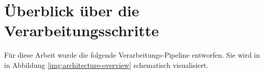 \section{Überblick über die Verarbeitungsschritte}
\label{sec:pipeline}


Für diese Arbeit wurde die folgende Verarbeitungs-Pipeline entworfen. Sie wird in in Abbildung \ref{img:architecture-overview} schematisch visualisiert. 

